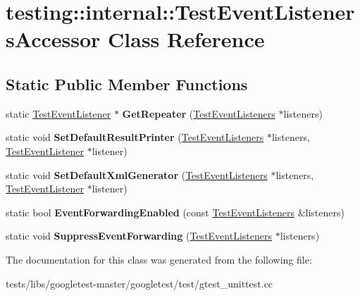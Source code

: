 \hypertarget{classtesting_1_1internal_1_1TestEventListenersAccessor}{}\section{testing\+:\+:internal\+:\+:Test\+Event\+Listeners\+Accessor Class Reference}
\label{classtesting_1_1internal_1_1TestEventListenersAccessor}
\subsection*{Static Public Member Functions}
\begin{DoxyCompactItemize}
\item 
\mbox{\label{classtesting_1_1internal_1_1TestEventListenersAccessor_a07c6f8644e509d0f23c0c16a60856387}} 
static \hyperlink{classtesting_1_1TestEventListener}{Test\+Event\+Listener} $\ast$ {\bfseries Get\+Repeater} (\hyperlink{classtesting_1_1TestEventListeners}{Test\+Event\+Listeners} $\ast$listeners)
\item 
\mbox{\label{classtesting_1_1internal_1_1TestEventListenersAccessor_ac8886c7cea5a4ad39aed276d3f58da75}} 
static void {\bfseries Set\+Default\+Result\+Printer} (\hyperlink{classtesting_1_1TestEventListeners}{Test\+Event\+Listeners} $\ast$listeners, \hyperlink{classtesting_1_1TestEventListener}{Test\+Event\+Listener} $\ast$listener)
\item 
\mbox{\label{classtesting_1_1internal_1_1TestEventListenersAccessor_a8c04463b5ba5ee6d6da36e2171c7fff0}} 
static void {\bfseries Set\+Default\+Xml\+Generator} (\hyperlink{classtesting_1_1TestEventListeners}{Test\+Event\+Listeners} $\ast$listeners, \hyperlink{classtesting_1_1TestEventListener}{Test\+Event\+Listener} $\ast$listener)
\item 
\mbox{\label{classtesting_1_1internal_1_1TestEventListenersAccessor_a4a7522557045cb55eb037dc61429d71c}} 
static bool {\bfseries Event\+Forwarding\+Enabled} (const \hyperlink{classtesting_1_1TestEventListeners}{Test\+Event\+Listeners} \&listeners)
\item 
\mbox{\label{classtesting_1_1internal_1_1TestEventListenersAccessor_abfc0a0f8163465f4f5d42436ec8c7cb3}} 
static void {\bfseries Suppress\+Event\+Forwarding} (\hyperlink{classtesting_1_1TestEventListeners}{Test\+Event\+Listeners} $\ast$listeners)
\end{DoxyCompactItemize}


The documentation for this class was generated from the following file\+:\begin{DoxyCompactItemize}
\item 
tests/libs/googletest-\/master/googletest/test/gtest\+\_\+unittest.\+cc\end{DoxyCompactItemize}
